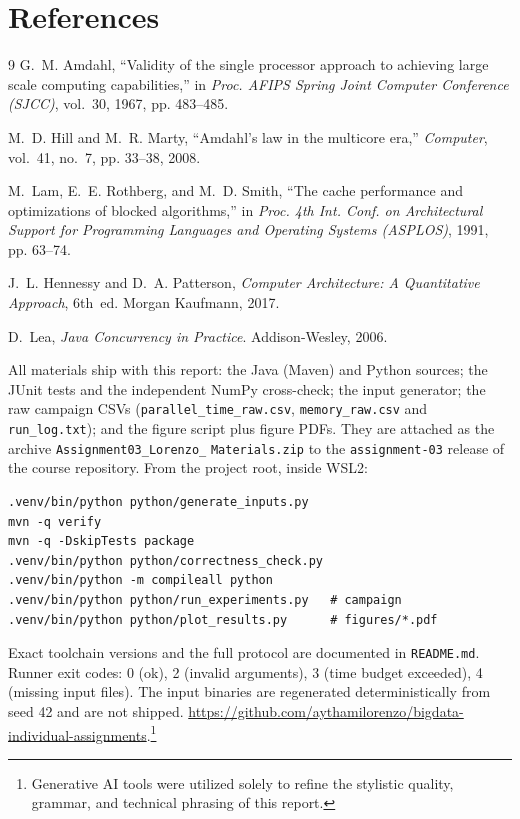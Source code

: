 \documentclass[11pt,a4paper]{article}
\makeatletter
\newcommand{\swallownextsectionstar}{%
  \let\originalsection\section
  \renewcommand{\section}{\@ifnextchar*{\swallowsectionstar}{\originalsection}}}
\def\swallowsectionstar*#1{\let\section\originalsection}
\makeatother
\begin{document}
\clearpage
\section{References}
\swallownextsectionstar
\begin{thebibliography}{9}
    G.~M. Amdahl, ``Validity of the single processor approach to achieving
    large scale computing capabilities,'' in \emph{Proc. AFIPS Spring Joint
    Computer Conference (SJCC)}, vol.~30, 1967, pp. 483--485.

    M.~D. Hill and M.~R. Marty, ``Amdahl's law in the multicore era,''
    \emph{Computer}, vol.~41, no.~7, pp. 33--38, 2008.

    M.~Lam, E.~E. Rothberg, and M.~D. Smith, ``The cache performance and
    optimizations of blocked algorithms,'' in \emph{Proc. 4th Int. Conf. on
    Architectural Support for Programming Languages and Operating Systems
    (ASPLOS)}, 1991, pp. 63--74.

    J.~L. Hennessy and D.~A. Patterson, \emph{Computer Architecture: A
    Quantitative Approach}, 6th~ed. Morgan Kaufmann, 2017.

    D.~Lea, \emph{Java Concurrency in Practice}. Addison-Wesley, 2006.
\end{thebibliography}

\section{Reproducibility materials}

All materials ship with this report: the Java (Maven) and Python sources;
the JUnit tests and the independent NumPy cross-check; the input
generator; the raw campaign CSVs
(\texttt{parallel\_}\allowbreak\texttt{time\_}\allowbreak\texttt{raw.csv},
\texttt{memory\_}\allowbreak\texttt{raw.csv} and \texttt{run\_log.txt});
and the figure script plus figure PDFs. They are attached as the archive
\texttt{Assignment03\_}\allowbreak\texttt{Lorenzo\_}\allowbreak
\texttt{Materials.zip} to the \texttt{assignment-03}
release of the course repository. From the project root, inside WSL2:

\begin{verbatim}
.venv/bin/python python/generate_inputs.py
mvn -q verify
mvn -q -DskipTests package
.venv/bin/python python/correctness_check.py
.venv/bin/python -m compileall python
.venv/bin/python python/run_experiments.py   # campaign
.venv/bin/python python/plot_results.py      # figures/*.pdf
\end{verbatim}

Exact toolchain versions and the full protocol are documented in
\texttt{README.md}. Runner exit codes: 0 (ok), 2 (invalid arguments), 3
(time budget exceeded), 4 (missing input files). The input binaries are
regenerated deterministically from seed 42 and are not shipped.
\url{https://github.com/aythamilorenzo/bigdata-individual-assignments}.\footnote{Generative AI
tools were utilized solely to refine the stylistic quality, grammar, and
technical phrasing of this report.}
\end{document}
